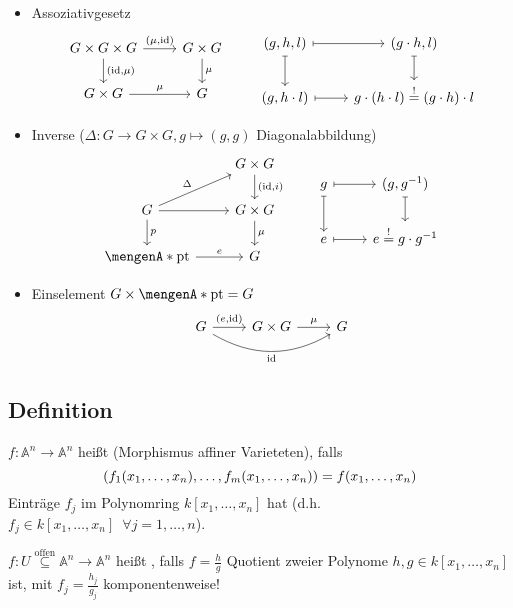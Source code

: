 \begin{itemize}
	\item Assoziativgesetz
	\[
		\begin{tikzcd}
			G \times G \times G \rar{(\mu,\id)} \dar{(\id,\mu)} & G \times G \dar["\mu"] \\
			G \times G \rar["\mu"] & G
		\end{tikzcd}
		\qquad
		\begin{tikzcd}
			(g,h,l) \rar[mapsto] \dar[mapsto]& (g \cdot h, l) \dar[mapsto]\\
			(g, h \cdot l) \rar[mapsto] & g \cdot (h \cdot l) \stackrel{!}{=} (g \cdot h) \cdot l
		\end{tikzcd}
	\]
	\item Inverse ($\Delta : G \to G \times G, g \mapsto (g,g)$ Diagonalabbildung)
	\[
		\begin{tikzcd}
			\mbox{ } & G \times G \dar{(\id, i)} \\
			G \rar \dar["p"]  \urar{\Delta} & G \times G \dar["\mu"] \\
			\set{\mathrm{pt}}  \rar["e"] & G
		\end{tikzcd}
		\qquad
		\begin{tikzcd}
			g \rar[mapsto] \dar[mapsto]& (g, g ^{-1}) \dar[mapsto] \\
			e \rar[mapsto]& e \stackrel{!}{=} g \cdot g ^{-1}
		\end{tikzcd}
	\]
	\item Einselement $G \times \set{\mathrm{pt}} = G $
	\[
		\begin{tikzcd}
			G \rar{(e,\id)} \arrow[bend right, swap]{rr}{\id} & G \times G \rar["\mu"] &  G
		\end{tikzcd}
	\]
\end{itemize}

\subsection{Definition} %
\label{sub:12}
$f : \mathds{A}^n \to \mathds{A}^n$ heißt  (Morphismus affiner Varieteten), falls
\[
	\enbrace*{ f_1 \enbrace*{x_1, \ldots , x_n}, \ldots , f_m(x_1, \ldots ,x_n) } = f(x_1, \ldots , x_n) 
\] 
Einträge $f_j$ im Polynomring $k[x_1, \ldots , x_n]$ hat (d.h. $f_j \in k[x_1, \ldots , x_n] \enspace \forall j=1, \ldots ,n$).

$f : U \stackrel{\text{offen}}{\subseteq} \mathds{A}^n \to \mathds{A}^n$ heißt , falls $f=\frac{h}{g}$ Quotient zweier Polynome 
$h,g \in k[x_1, \ldots , x_n]$ ist, mit $f_j = \frac{h_j}{g_j} $ komponentenweise!

